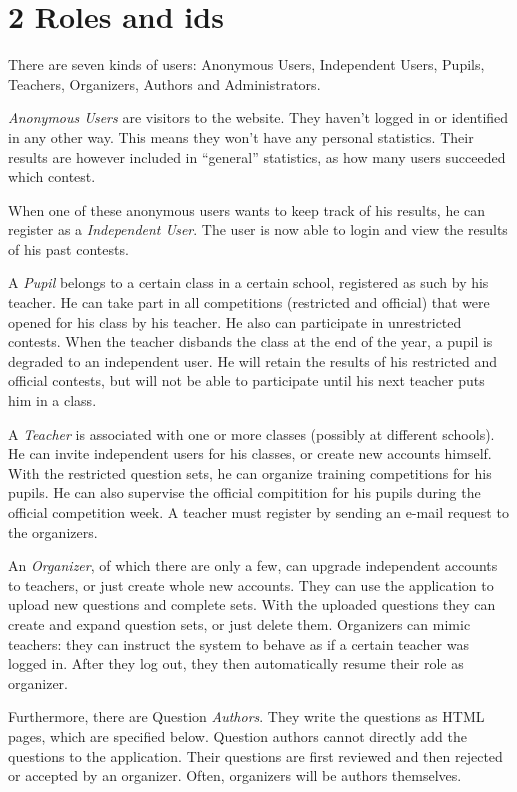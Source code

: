 
\section*{2 Roles and ids}

There are seven kinds of users: Anonymous Users, Independent Users, Pupils,
Teachers, Organizers, Authors and Administrators.

\textit{Anonymous Users} are visitors to the website. They haven't logged in or
identified in any other way. This means they won't have any personal
statistics. Their results are however included in ``general'' statistics, as
how many users succeeded which contest.

When one of these anonymous users wants to keep track of his results, he can
register as a \textit{Independent User}. The user is now able to login and
view the results of his past contests.

A \textit{Pupil} belongs to a certain class in a certain school, registered
as such by his teacher. He can take part in all competitions (restricted and
official) that were opened for his class by his teacher. He also can
participate in unrestricted contests. When the teacher disbands the class at
the end of the year, a pupil is degraded to an independent user. He will
retain the results of his restricted and official contests, but will not be
able to participate until his next teacher puts him in a class.

A \textit{Teacher} is associated with one or more classes (possibly at
different schools). He can invite independent users for his classes, or create
new accounts himself. With the restricted question sets, he can organize
training competitions for his pupils. He can also supervise the official
compitition for his pupils during the official competition week. A teacher
must register by sending an e-mail request to the organizers.

An \textit{Organizer}, of which there are only a few, can upgrade independent
accounts to teachers, or just create whole new accounts. They can use the
application to upload new questions and complete sets. With the uploaded
questions they can create and expand question sets, or just delete them.
Organizers can mimic teachers: they can instruct the system to behave as if a
certain teacher was logged in. After they log out, they then automatically
resume their role as organizer.

Furthermore, there are Question \textit{Authors}. They write the questions
as HTML pages, which are specified below. Question authors cannot directly
add the questions to the application. Their questions are first reviewed and
then rejected or accepted by an organizer. Often, organizers will be authors
themselves.

